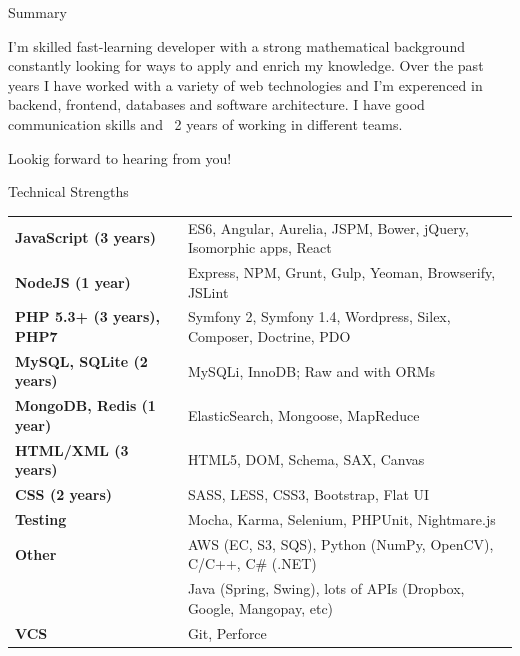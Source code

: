 \documentclass{resume} %
\begin{document}

\begin{rSection}{Summary}

I'm skilled fast-learning developer with a strong mathematical background constantly looking for ways to apply and enrich my knowledge. Over the past years I have worked with a variety of web technologies and I'm experenced in backend, frontend, databases and software architecture. I have good communication skills and ~2 years of working in different teams.

Lookig forward to hearing from you!

\end{rSection}



\begin{rSection}{Technical Strengths}

\begin{tabular}{ @{} >{\bfseries}l @{\hspace{4ex}} l }
JavaScript (3 years) & ES6, Angular, Aurelia, JSPM, Bower, jQuery, Isomorphic apps, React \\
NodeJS (1 year) & Express, NPM, Grunt, Gulp, Yeoman, Browserify, JSLint \\
PHP 5.3+ (3 years), PHP7 & Symfony 2, Symfony 1.4, Wordpress, Silex, Composer, Doctrine, PDO \\
MySQL, SQLite (2 years) & MySQLi, InnoDB; Raw and with ORMs \\
MongoDB, Redis (1 year) & ElasticSearch, Mongoose, MapReduce \\
HTML/XML (3 years) & HTML5, DOM, Schema, SAX, Canvas \\
CSS (2 years) & SASS, LESS, CSS3, Bootstrap, Flat UI \\
Testing & Mocha, Karma, Selenium, PHPUnit, Nightmare.js \\
Other & AWS (EC, S3, SQS), Python (NumPy, OpenCV), C/C++, C\# (.NET) \\
 & Java (Spring, Swing), lots of APIs (Dropbox, Google, Mangopay, etc) \\
VCS & Git, Perforce \\
\end{tabular}

\end{rSection}
\end{document}
